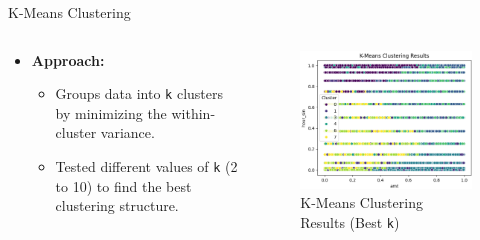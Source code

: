 \documentclass{beamer}
\begin{document}
\begin{frame}{K-Means Clustering}
        \begin{columns} %
    \begin{column}{0.6\textwidth}
    \begin{itemize}
        \item \textbf{Approach:}
        \begin{itemize}
            \item Groups data into \texttt{k} clusters by minimizing the within-cluster variance.
            \item Tested different values of \texttt{k} (2 to 10) to find the best clustering structure.
        \end{itemize}
    \end{itemize}
    \end{column}

    \begin{column}{0.4\textwidth}
    \begin{figure}
        \centering
        \includegraphics[width=1\textwidth]{images/kmeans.png} %
        \caption{K-Means Clustering Results (Best \texttt{k})}
    \end{figure}
\end{column}
\end{columns}
\end{frame}
\end{document}
